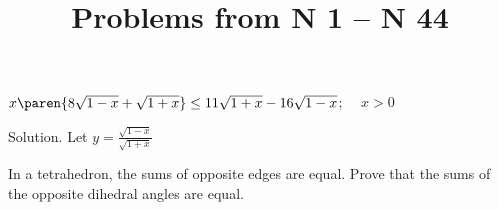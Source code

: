 \documentclass{article}
\title{Problems  from N 1 -- N 44}
\author{}
\date{}
\begin{document}
\maketitle


\problem  %

$x \paren{8 \sqrt{1 - x} + \sqrt{1 + x}} \leq 11 \sqrt{1 + x} - 16 \sqrt{1 - x}$; $\quad x > 0$

Solution.
Let $y = \frac{\sqrt{1 - x}}{\sqrt{1 + x}}$



\problem  %

In a tetrahedron, the sums of opposite edges are equal. Prove that the sums of the opposite dihedral angles are equal.



\end{document}

